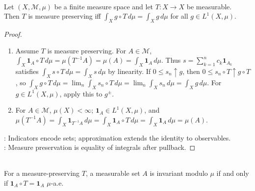 \begin{proposition} \label{prop:measure-preserving-integral-test} \\
Let $(X,\mathcal{M},\mu)$ be a finite measure space and let $T:X\to X$ be measurable.\\
Then $T$ is measure preserving iff $\int_X g\circ T\,d\mu=\int_X g\,d\mu$ for all $g\in L^1(X,\mu)$.
\begin{proof}
\begin{enumerate}[label=\roman*.]
\setlength{\itemsep}{0pt}
\item[$(\Rightarrow)$] Assume $T$ is measure preserving. For $A\in\mathcal{M}$, $\int_X\mathbf{1}_A\circ T\,d\mu=\mu(T^{-1}A)=\mu(A)=\int_X\mathbf{1}_A\,d\mu$. Thus $s=\sum_{k=1}^n c_k\mathbf{1}_{A_k}$ satisfies $\int_X s\circ T\,d\mu=\int_X s\,d\mu$ by linearity. If $0\le s_n\uparrow g$, then $0\le s_n\circ T\uparrow g\circ T$, so $\int_X g\circ T\,d\mu=\lim_n\int_X s_n\circ T\,d\mu=\lim_n\int_X s_n\,d\mu=\int_X g\,d\mu$. For $g\in L^1(X,\mu)$, apply this to $g^\pm$.
\item[$(\Leftarrow)$] For $A\in\mathcal{M}$, $\mu(X)<\infty$; $\mathbf{1}_A\in L^1(X,\mu)$, and $\mu(T^{-1}A)=\int_X\mathbf{1}_{T^{-1}A}\,d\mu=\int_X\mathbf{1}_A\circ T\,d\mu=\int_X\mathbf{1}_A\,d\mu=\mu(A)$.
\end{enumerate}
: Indicators encode sets; approximation extends the identity to observables.\\
: Measure preservation is equality of integrals after pullback.
\end{proof}
\end{proposition}

\begin{remark} \label{rem:invariant-set-indicator-test} \\
For a measure-preserving $T$, a measurable set $A$ is invariant modulo $\mu$ if and only if $\mathbf{1}_A\circ T=\mathbf{1}_A$ $\mu$-a.e.
\end{remark}


